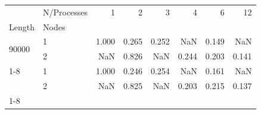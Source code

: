 \begin{tabular}{llrrrrrr}
\toprule
 & N/Processes & 1 & 2 & 3 & 4 & 6 & 12 \\
Length & Nodes &  &  &  &  &  &  \\
\midrule
\multirow[t]{2}{*}{90000} & 1 & 1.000 & 0.265 & 0.252 & NaN & 0.149 & NaN \\
 & 2 & NaN & 0.826 & NaN & 0.244 & 0.203 & 0.141 \\
\cline{1-8}
\multirow[t]{2}{*}{150000} & 1 & 1.000 & 0.246 & 0.254 & NaN & 0.161 & NaN \\
 & 2 & NaN & 0.825 & NaN & 0.203 & 0.215 & 0.137 \\
\cline{1-8}
\bottomrule
\end{tabular}
